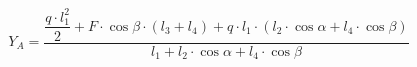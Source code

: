 \documentclass[preview]{standalone}
\begin{document}
\begin{align*}
Y_A  = \dfrac{\dfrac{q\cdot l_1^2}{2} + F\cdot \cos{\beta} \cdot (l_3 + l_4) + q\cdot l_1\cdot (l_2\cdot \cos{\alpha} + l_4\cdot\cos{\beta})}{l_1 + l_2\cdot \cos{\alpha} + l_4\cdot \cos{\beta}}
\end{align*}
\end{document}
